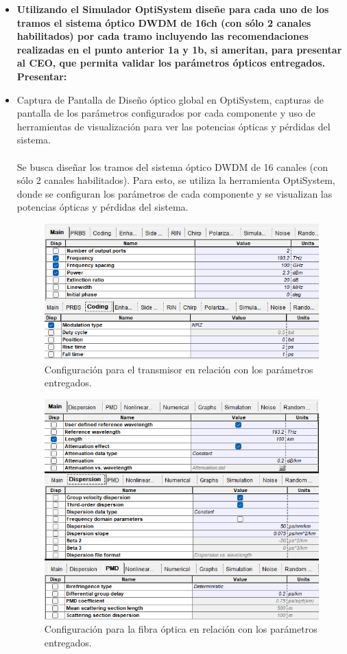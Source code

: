 \begin{itemize}
	\item \textbf{Utilizando el Simulador OptiSystem diseñe para cada uno de los tramos el
	sistema óptico DWDM de 16ch (con sólo 2 canales habilitados) por cada tramo
	incluyendo las recomendaciones realizadas en el punto anterior 1a y 1b, si ameritan,
	para presentar al CEO, que permita validar los parámetros ópticos entregados.
	Presentar:}
	\item Captura de Pantalla de Diseño óptico global en OptiSystem, capturas de pantalla de los parámetros configurados por cada componente y uso de herramientas de visualización para ver las potencias ópticas y pérdidas del sistema.\\\\
Se busca diseñar los tramos del sistema óptico DWDM de 16 canales (con sólo 2 canales habilitados). Para esto, se utiliza la herramienta OptiSystem, donde se configuran los parámetros de cada componente y se visualizan las potencias ópticas y pérdidas del sistema.

\begin{figure}[H]
	\centering
	\includegraphics[width=0.8\linewidth]{img/ejemplos/Figure_2}
	\caption{Configuración para el transmisor en relación con los parámetros entregados.}
	\label{fig:optisystem_tx}
\end{figure}

\begin{figure}[H]
	\centering
	\includegraphics[width=0.7\linewidth]{img/ejemplos/Figure_3}
	\caption{Configuración para la fibra óptica en relación con los parámetros entregados.}
	\label{fig:optisystem_fiber}
\end{figure}


\end{itemize}
